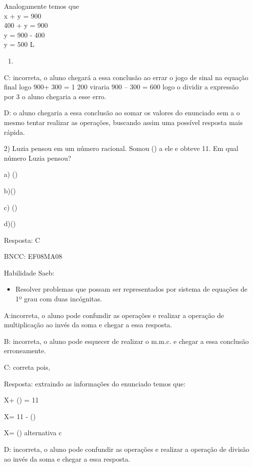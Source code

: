 Analogamente temos que\\
x + y = 900\\
400 + y = 900\\
y = 900 - 400\\
y = 500 L

\begin{enumerate}
\def\labelenumi{\Alph{enumi}.}
\setcounter{enumi}{1}
\tightlist
\item
\end{enumerate}

C: incorreta, o aluno chegará a essa conclusão ao errar o jogo de sinal
na equação final logo 900+ 300 = 1 200 viraria 900 -- 300 = 600 logo o
dividir a expressão por 3 o aluno chegaria a esse erro.

D: o aluno chegaria a essa conclusão ao somar os valores do enunciado
sem a o mesmo tentar realizar as operações, buscando assim uma possível
resposta mais rápida.

2) Luzia pensou em um número racional. Somou () a ele e
obteve 11. Em qual número Luzia pensou?

a) ()

b)()

c) ()

d)()

Resposta: C

BNCC: EF08MA08

Habilidade Saeb:

\begin{itemize}
\tightlist
\item
  Resolver problemas que possam ser representados por sistema de
  equações de 1º grau com duas incógnitas.
\end{itemize}

A:incorreta, o aluno pode confundir as operações e realizar a operação
de multiplicação ao invés da soma e chegar a essa resposta.

B: incorreta, o aluno pode esquecer de realizar o m.m.c. e chegar a essa
conclusão erroneamente.

C: correta pois,

Resposta: extraindo as informações do enunciado temos que:

X+ () = 11

X= 11 - ()

X= () alternativa c

D: incorreta, o aluno pode confundir as operações e realizar a operação
de divisão ao invés da soma e chegar a essa resposta.

